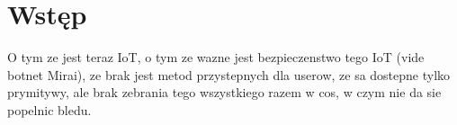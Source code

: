 \chapter{Wstęp}

O tym ze jest teraz IoT, o tym ze wazne jest bezpieczenstwo tego IoT (vide botnet Mirai), ze brak jest metod przystepnych dla userow, ze sa dostepne tylko prymitywy, ale brak zebrania tego wszystkiego razem w cos, w czym nie da sie popelnic bledu.
